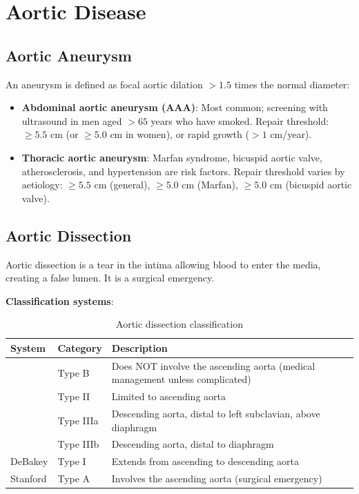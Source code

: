 \section{Aortic Disease}

\subsection{Aortic Aneurysm}
An aneurysm is defined as focal aortic dilation $> 1.5$ times the normal diameter:
\begin{itemize}
  \item \textbf{Abdominal aortic aneurysm (AAA)}: Most common; screening with ultrasound in men aged $> 65$ years who have smoked. Repair threshold: $\geq 5.5$ cm (or $\geq 5.0$ cm in women), or rapid growth ($> 1$ cm/year).
  \item \textbf{Thoracic aortic aneurysm}: Marfan syndrome, bicuspid aortic valve, atherosclerosis, and hypertension are risk factors. Repair threshold varies by aetiology: $\geq 5.5$ cm (general), $\geq 5.0$ cm (Marfan), $\geq 5.0$ cm (bicuspid aortic valve).
\end{itemize}

\subsection{Aortic Dissection}
Aortic dissection is a tear in the intima allowing blood to enter the media, creating a false lumen. It is a surgical emergency.

\textbf{Classification systems}:

\begin{table}[h]
\centering
\caption{Aortic dissection classification}
\begin{tabular}{p{3cm} p{4.5cm} p{4.5cm}}
\hline
\textbf{System} & \textbf{Category} & \textbf{Description} \\
\hline
& Type B & Does NOT involve the ascending aorta (medical management unless complicated) \\
& Type II & Limited to ascending aorta \\
& Type IIIa & Descending aorta, distal to left subclavian, above diaphragm \\
& Type IIIb & Descending aorta, distal to diaphragm \\
DeBakey & Type I & Extends from ascending to descending aorta \\
Stanford & Type A & Involves the ascending aorta (surgical emergency) \\
\hline
\end{tabular}
\end{table}

